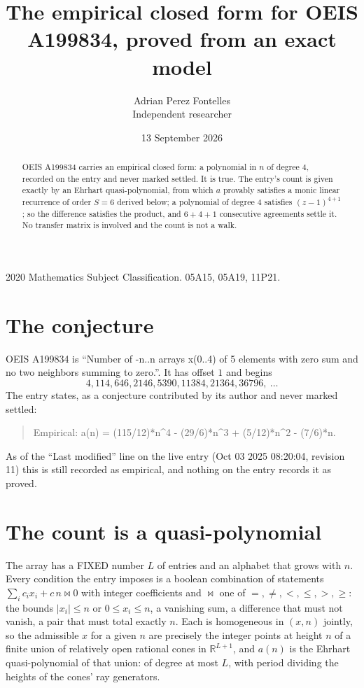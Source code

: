 \documentclass[11pt,a4paper]{article}
\title{The empirical closed form for OEIS A199834, proved from an exact model}
\author{Adrian Perez Fontelles\\ \small Independent researcher}
\date{13 September 2026}
\theoremstyle{plain}
\theoremstyle{definition}
\begin{document}
\maketitle

\begin{abstract}
OEIS A199834 carries an empirical closed form: a polynomial in $n$ of degree $4$, recorded on the
entry and never marked settled. It is true. The entry's count is given exactly by an Ehrhart
quasi-polynomial, from which $a$ provably satisfies a monic linear recurrence of order $S=6$
derived below; a polynomial of degree $4$ satisfies $(z-1)^{4+1}$; so the difference
satisfies the product, and $6+4+1$ consecutive agreements settle it. No transfer matrix is
involved and the count is not a walk.
\end{abstract}

\noindent\small 2020 Mathematics Subject Classification. 05A15, 05A19, 11P21.\normalsize

\section{The conjecture}

OEIS A199834 is ``Number of -n..n arrays x(0..4) of 5 elements with zero sum and no two neighbors summing to zero.''. It has offset $1$ and begins
\[
4, 114, 646, 2146, 5390, 11384, 21364, 36796,\ \dots
\]
The entry states, as a conjecture contributed by its author and never marked settled:
\begin{quote}
Empirical: a(n) = (115/12)*n\^{}4 - (29/6)*n\^{}3 + (5/12)*n\^{}2 - (7/6)*n.
\end{quote}
As of the ``Last modified'' line on the live entry (Oct 03 2025 08:20:04, revision 11)
this is still recorded as empirical, and nothing on the entry records it as proved.

\section{The count is a quasi-polynomial}

The array has a FIXED number $L$ of entries and an alphabet that grows with $n$. Every
condition the entry imposes is a boolean combination of statements
$\sum_i c_ix_i + c\,n \bowtie 0$ with integer coefficients and $\bowtie$ one of
$=,\ne,<,\le,>,\ge$: the bounds $|x_i|\le n$ or $0\le x_i\le n$, a vanishing sum, a difference
that must not vanish, a pair that must total exactly $n$. Each is homogeneous in $(x,n)$
jointly, so the admissible $x$ for a given $n$ are precisely the integer points at height $n$
of a finite union of relatively open rational cones in $\mathbb{R}^{L+1}$, and $a(n)$ is
the Ehrhart quasi-polynomial of that union: of degree at most $L$, with period dividing the
heights of the cones' ray generators.
\end{document}
